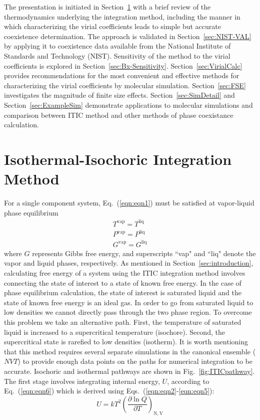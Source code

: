 \documentclass[%
 aip,
 jcp,
 sd,%
 amsmath,amssymb,
 reprint,%
]{revtex4-1}
\begin{document}
The presentation is initiated in Section~\ref{sec:ITIC-method} with a brief review of the thermodynamics underlying the integration method, including the manner in which characterizing the virial coefficients leads to simple but accurate coexistence determination. The approach is validated in Section~\ref{sec:NIST-VAL} by applying it to coexistence data available from the National Institute of Standards and Technology (NIST). Sensitivity of the method to the virial coefficients is explored in Section~\ref{sec:Bx-Sensitivity}. Section~\ref{sec:VirialCalc} provides recommendations for the most convenient and effective methods for characterizing the virial coefficients by molecular simulation. 
Section~\ref{sec:FSE} investigates the magnitude of finite size effects. 
Section~\ref{sec:SimDetail} and Section~\ref{sec:ExampleSim} demonstrate applications to molecular simulations and comparison between ITIC method and other methods of phase coexistance calculation.

\section{Isothermal-Isochoric Integration Method} \label{sec:ITIC-method}
For a single component system, Eq.~(\ref{eqn:eqn1}) must be satisfied at vapor-liquid phase equilibrium
\begin{equation}
\begin{array}{l} {T^{\mathrm{vap}} =T^{\mathrm{liq}} } \\ {P^{\mathrm{vap}} =P^{\mathrm{liq}} } \\ {G^{\mathrm{vap}} =G^{\mathrm{liq}} } \end{array} \label{eqn:eqn1}
\end{equation}
where $G$ represents Gibbs free energy, and superscripts ``vap" and ``liq" denote the vapor and liquid phases, respectively. As mentioned in Section~\ref{sec:introduction}, calculating free energy of a system using the ITIC integration method involves connecting the state of interest to a state of known free energy. In the case of phase equilibrium calculation, the state of interest is saturated liquid and the state of known free energy is an ideal gas. In order to go from saturated liquid to low densities we cannot directly pass through the two phase region. To overcome this problem we take an alternative path. First, the temperature of saturated liquid is increased to a supercritical temperature (isochore). Second, the supercritical state is rarefied to low densities (isotherm). It is worth mentioning that this method requires several separate simulations in the canonical ensemble ($NVT$) to provide enough data points on the paths for numerical integration to be accurate. Isochoric and isothermal pathways are shown in Fig.~\ref{fig:ITICpathway}. The first stage involves integrating internal energy, $U$, according to Eq.~(\ref{eqn:eqn6}) which is derived using Eqs.~(\ref{eqn:eqn2}-\ref{eqn:eqn5}):
\begin{equation}
U=kT^{2} \left( \frac{\partial \ln Q}{\partial T}\right) _{\mathrm N,\mathrm V}  \label{eqn:eqn2}
\end{equation}
\end{document}

